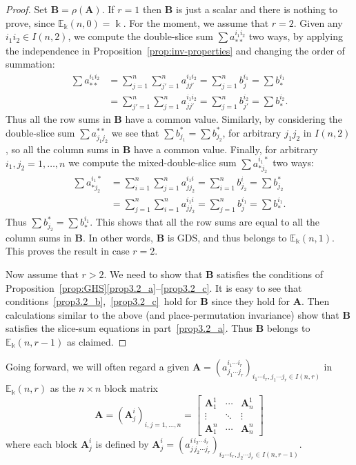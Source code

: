 \documentclass[10pt]{article}
\theoremstyle{definition}
\newcommand{\E}{\mathbb{E}}
\newcommand{\bA}{\mathbf{A}}
\newcommand{\bB}{\mathbf{B}}
\begin{document}
\begin{proof}
Set $\bB = \rho(\bA)$. If $r=1$ then $\bB$ is just a scalar and there
is nothing to prove, since $\E_\Bbbk(n,0) = \Bbbk$. For the moment, we
assume that $r=2$. Given any $i_1i_2 \in I(n,2)$, we compute the
double-slice sum $\sum a^{i_1i_2}_{**}$ two ways, by applying the
independence in Proposition~\ref{prop:inv-properties} and changing
the order of summation:
\begin{align*}
\sum a^{i_1i_2}_{**} &= \sum_{j=1}^n \sum_{j'=1}^n a^{i_1i_2}_{jj'} =
\sum_{j=1}^n b^{i_1}_j = \sum b^{i_1}_*\\
&= \sum_{j'=1}^n \sum_{j=1}^n a^{i_1i_2}_{jj'} =
\sum_{j=1}^n b^{i_2}_{j'} = \sum b^{i_2}_* .
\end{align*}
Thus all the row sums in $\bB$ have a common value. Similarly, by
considering the double-slice sum $\sum a^{**}_{j_1j_2}$ we see that
$\sum b^*_{j_1} = \sum b^*_{j_2}$, for arbitrary $j_1j_2$ in $I(n,2)$,
so all the column sums in $\bB$ have a common value. Finally, for
arbitrary $i_1, j_2 = 1, \dots, n$ we compute the mixed-double-slice
sum $\sum a^{i_1*}_{*j_2}$ two ways:
\begin{align*}
\sum a^{i_1*}_{*j_2} &= \sum_{i=1}^n \sum_{j=1}^n a^{i_1i}_{jj_2} =
\sum_{i=1}^n b^{i}_{j_2} = \sum b^{*}_{j_2}\\
&= \sum_{j=1}^n \sum_{i=1}^n a^{i_1i}_{jj_2} =
\sum_{j=1}^n b^{i_1}_{j} = \sum b^{i_1}_* .
\end{align*}
Thus $\sum b^{*}_{j_2} = \sum b^{i_1}_{*}$. This shows that all the
row sums are equal to all the column sums in $\bB$. In other words,
$\bB$ is GDS, and thus belongs to $\E_\Bbbk(n,1)$. This proves the
result in case $r=2$.

Now assume that $r>2$. We need to show that $\bB$ satisfies the
conditions of Proposition~\ref{prop:GHS}\ref{prop3.2_a}--\ref{prop3.2_c}. It is easy to see
that conditions~\ref{prop3.2_b},~\ref{prop3.2_c}~hold for $\bB$ since they hold for
$\bA$. Then calculations similar to the above (and place-permutation
invariance) show that $\bB$ satisfies the slice-sum equations in part~\ref{prop3.2_a}. Thus $\bB$ belongs to $\E_\Bbbk(n,r-1)$ as claimed.
\end{proof}

Going forward, we will often regard a given $\bA = (a^{i_1
 \cdots i_r}_{j_1 \cdots j_r})_{i_1 \cdots i_r, j_1 \cdots j_r \in
 I(n,r)}$ in $\E_\Bbbk(n,r)$ as the $n \times n$ block matrix
\begin{equation}\label{eq:blocks}
\bA = (\bA^i_j)_{i,j = 1, \dots,n} = 
\begin{bmatrix}
 \bA^1_1 & \cdots & \bA^1_n \\
 \vdots & \ddots & \vdots \\
 \bA^n_1 & \cdots & \bA^n_n
\end{bmatrix}
\end{equation}
where each block $\bA^i_j$ is defined by $\bA^i_j = (a^{i\, i_2 \cdots
 i_r}_{j\, j_2 \cdots j_r})_{i_2 \cdots i_r, j_2 \cdots j_r \in
 I(n,r-1)}$.
\end{document}
